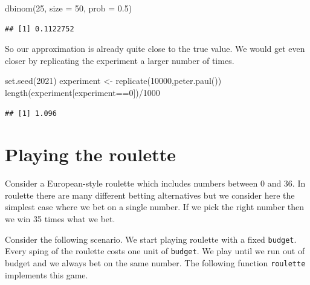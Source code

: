 \documentclass[
]{book}
\newenvironment{Shaded}{\begin{snugshade}}{\end{snugshade}}
\newcommand{\AttributeTok}[1]{\textcolor[rgb]{0.77,0.63,0.00}{#1}}
\newcommand{\DecValTok}[1]{\textcolor[rgb]{0.00,0.00,0.81}{#1}}
\newcommand{\FloatTok}[1]{\textcolor[rgb]{0.00,0.00,0.81}{#1}}
\newcommand{\FunctionTok}[1]{\textcolor[rgb]{0.00,0.00,0.00}{#1}}
\newcommand{\NormalTok}[1]{#1}
\newcommand{\OtherTok}[1]{\textcolor[rgb]{0.56,0.35,0.01}{#1}}
\newcommand{\SpecialCharTok}[1]{\textcolor[rgb]{0.00,0.00,0.00}{#1}}
\begin{document}
\begin{Shaded}
\begin{Highlighting}[]
\FunctionTok{dbinom}\NormalTok{(}\DecValTok{25}\NormalTok{, }\AttributeTok{size =} \DecValTok{50}\NormalTok{, }\AttributeTok{prob =} \FloatTok{0.5}\NormalTok{)}
\end{Highlighting}
\end{Shaded}

\begin{verbatim}
## [1] 0.1122752
\end{verbatim}

So our approximation is already quite close to the true value. We would get even closer by replicating the experiment a larger number of times.

\begin{Shaded}
\begin{Highlighting}[]
\FunctionTok{set.seed}\NormalTok{(}\DecValTok{2021}\NormalTok{)}
\NormalTok{experiment }\OtherTok{\textless{}{-}} \FunctionTok{replicate}\NormalTok{(}\DecValTok{10000}\NormalTok{,}\FunctionTok{peter.paul}\NormalTok{())}
\FunctionTok{length}\NormalTok{(experiment[experiment}\SpecialCharTok{==}\DecValTok{0}\NormalTok{])}\SpecialCharTok{/}\DecValTok{1000}
\end{Highlighting}
\end{Shaded}

\begin{verbatim}
## [1] 1.096
\end{verbatim}

\hypertarget{playing-the-roulette}{%
\section{Playing the roulette}\label{playing-the-roulette}}

Consider a European-style roulette which includes numbers between 0 and 36. In roulette there are many different betting alternatives but we consider here the simplest case where we bet on a single number. If we pick the right number then we win 35 times what we bet.

Consider the following scenario. We start playing roulette with a fixed \texttt{budget}. Every sping of the roulette costs one unit of \texttt{budget}. We play until we run out of budget and we always bet on the same number. The following function \texttt{roulette} implements this game.
\end{document}
